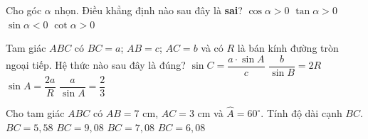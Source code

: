 \begin{ex}%
	Cho góc $\alpha$ nhọn. Điều khẳng định nào sau đây là \textbf{sai}?
	\choice
	{$\cos \alpha>0$}
	{$\tan \alpha>0$}
	{\True $\sin \alpha<0$}
	{$\cot \alpha>0$}
\end{ex}
\begin{ex}%
	Tam giác $ABC$ có $BC=a$; $AB=c$; $AC=b$ và có $R$ là bán kính đường tròn ngoại tiếp. Hệ thức nào sau đây là đúng?
	\choice
	{$\sin C=\dfrac{a \cdot \sin A}{c}$}
	{\True $\dfrac{b}{\sin B}=2 R$}
	{$\sin A=\dfrac{2a}{R}$}
	{$\dfrac{a}{\sin A}=\dfrac{2}{3}$}
\end{ex}
\begin{ex}%
	Cho tam giác $ABC$ có $AB=7$ cm, $AC=3$ cm và $\widehat{A}=60^\circ$. Tính độ dài cạnh $BC$.
	\choice
	{$BC=5{,}58$}
	{$BC=9{,}08$}
	{$BC=7{,}08$}
	{\True $BC=6{,}08$}
\end{ex}
